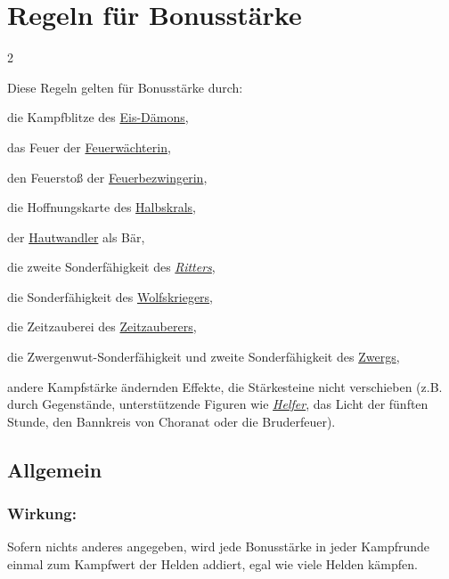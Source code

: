 \documentclass[10pt, a4paper, oneside]{book}
\newcommand{\fan}[1]{\textit{#1}}
\begin{document}
\chapter{Regeln für Bonusstärke}
\label{bonusstaerke}



\begin{multicols*}{2}\raggedcolumns

\begin{nobgcolor}


Diese Regeln gelten für Bonusstärke durch:

\bullet{} die Kampfblitze des \hyperref[eis-daemon]{Eis-Dämons},

\bullet{} das Feuer der \hyperref[feuerwaechterin]{Feuerwächterin},

\bullet{} den Feuerstoß der \hyperref[feuerbezwingerin]{Feuerbezwingerin},

\bullet{} die Hoffnungskarte des \hyperref[halbskral]{Halbskrals},

\bullet{} der \hyperref[hautwandler]{Hautwandler} als Bär,

\bullet{} die zweite Sonderfähigkeit des \hyperref[ritter]{\fan{Ritters}},
 
\bullet{} die Sonderfähigkeit des \hyperref[wolfskrieger]{Wolfskriegers},

\bullet{} die Zeitzauberei des \hyperref[zeitzauberer]{Zeitzauberers},

\bullet{} die Zwergenwut-Sonderfähigkeit und zweite Sonderfähigkeit des \hyperref[zwerg]{Zwergs},

\bullet{} andere Kampfstärke ändernden Effekte, die Stärkesteine nicht verschieben (z.B. durch Gegenstände, unterstützende Figuren wie \hyperref[helfer]{\fan{Helfer}}, das Licht der fünften Stunde, den Bannkreis von Choranat oder die Bruderfeuer).



\section{Allgemein}


\subsection{Wirkung:}

Sofern nichts anderes angegeben, wird jede Bonusstärke in jeder Kampfrunde einmal zum Kampfwert der Helden addiert, egal wie viele Helden kämpfen.
\supercite{17907}


\end{nobgcolor}
\end{multicols*}
\end{document}
